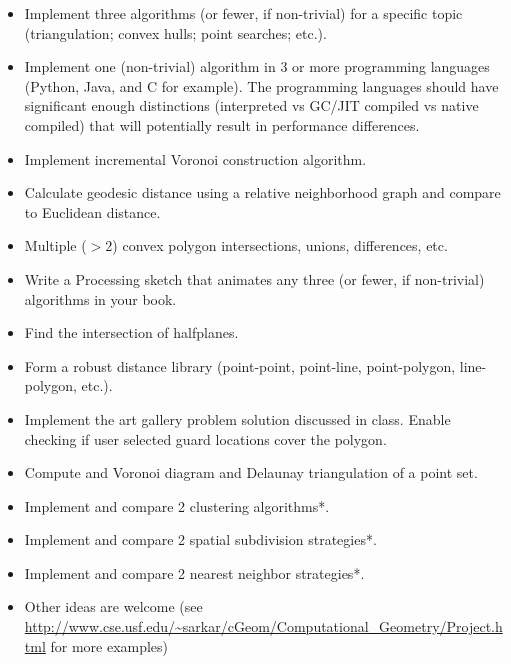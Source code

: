 \documentclass[a4paper,12pt]{article}
\begin{document}

\begin{itemize}
    \item Implement three algorithms (or fewer, if non-trivial) for a specific topic (triangulation; convex hulls; point searches; etc.).
    \item Implement one (non-trivial) algorithm in 3 or more programming languages (Python, Java, and C for example). The programming languages should have significant enough distinctions (interpreted vs GC/JIT compiled vs native compiled) that will potentially result in performance differences.
    \item Implement incremental Voronoi construction algorithm.
    \item Calculate geodesic distance using a relative neighborhood graph and compare to Euclidean distance.
    \item Multiple ($>2$) convex polygon intersections, unions, differences, etc.
    \item Write a Processing sketch that animates any three (or fewer, if non-trivial) algorithms in your book. 
    \item Find the intersection of halfplanes.
    \item Form a robust distance library (point-point, point-line, point-polygon, line-polygon, etc.).
    \item Implement the art gallery problem solution discussed in class. Enable checking if user selected guard locations cover the polygon.
    \item Compute and Voronoi diagram and Delaunay triangulation of a point set.
    \item Implement and compare 2 clustering algorithms*.
	\item Implement and compare 2 spatial subdivision strategies*.
	\item Implement and compare 2 nearest neighbor strategies*.
    \item Other ideas are welcome (see \url{http://www.cse.usf.edu/~sarkar/cGeom/Computational_Geometry/Project.html} for more examples)
\end{itemize}
\end{document}
